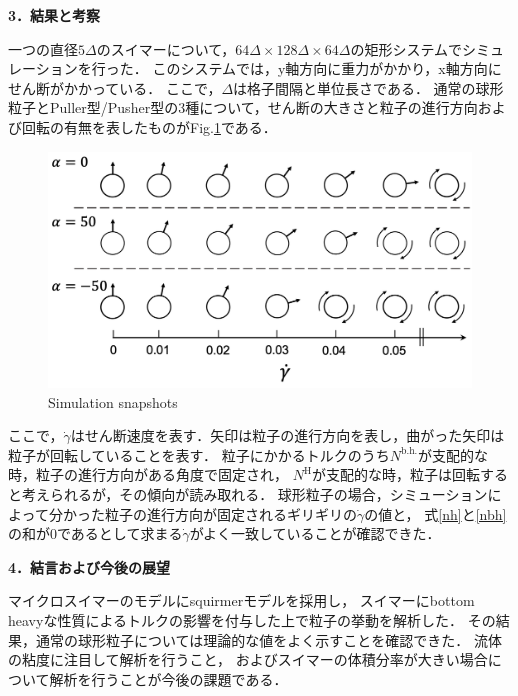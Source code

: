 \documentclass[twocolumns,10pt,a4j]{jarticle}
\begin{document}
  \vspace{0.5truemm}
  \noindent
  {\bf \large 3．結果と考察}
  \par
一つの直径$5\Delta$のスイマーについて，$64\Delta \times 128\Delta \times 64\Delta$の矩形システムでシミュレーションを行った．
このシステムでは，y軸方向に重力がかかり，x軸方向にせん断がかかっている．
ここで，$\Delta$は格子間隔と単位長さである．
通常の球形粒子とPuller型/Pusher型の3種について，せん断の大きさと粒子の進行方向および回転の有無を表したものがFig.\ref{snapshots}である．
  \vspace{-3truemm}
  \begin{figure}[h]
    \hspace{-3truemm}
    \centering
    \includegraphics[width=80truemm]{./images/rotation.png}
    \vspace{-6truemm}
    \hspace{-2truemm}
    \caption{Simulation snapshots}
    \label{snapshots}
  \end{figure}
  \vspace{-3truemm}

  \noindent
ここで，$\dot{\gamma}$はせん断速度を表す．矢印は粒子の進行方向を表し，曲がった矢印は粒子が回転していることを表す．
粒子にかかるトルクのうち$N^\mathrm{b.h.}$が支配的な時，粒子の進行方向がある角度で固定され，
$N^\mathrm{H}$が支配的な時，粒子は回転すると考えられるが，その傾向が読み取れる．
球形粒子の場合，シミューションによって分かった粒子の進行方向が固定されるギリギリの$\dot{\gamma}$の値と，
式\eqref{nh}と\eqref{nbh}の和が0であるとして求まる$\dot{\gamma}$がよく一致していることが確認できた．


  \vspace{0.5truemm}
  \noindent
  \textbf{\large 4．結言および今後の展望}
  \par
マイクロスイマーのモデルにsquirmerモデルを採用し，
スイマーにbottom heavyな性質によるトルクの影響を付与した上で粒子の挙動を解析した．
その結果，通常の球形粒子については理論的な値をよく示すことを確認できた．
流体の粘度に注目して解析を行うこと，
およびスイマーの体積分率が大きい場合について解析を行うことが今後の課題である．
  \vspace{-7.5truemm}
\end{document}
